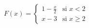 \setcounter{enumi}{37}
    \item $F(x) = \begin{cases} 1 - \frac{x}{2} & \text{si } x < 2 \\ x - 3 & \text{si } x \ge 2 \end{cases}$
